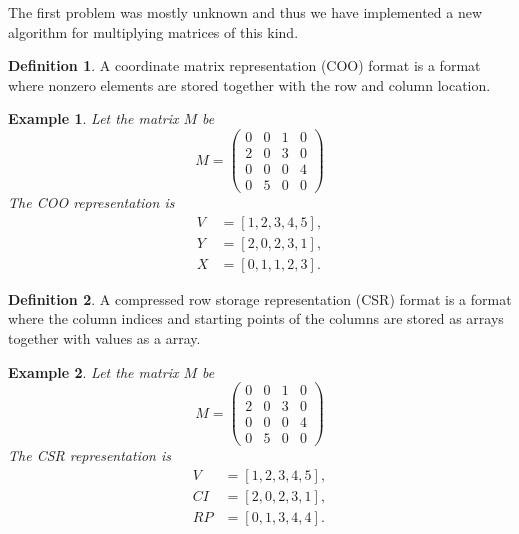 \documentclass[portrait,a0]{sciposter}
\theoremstyle{definition}\newtheorem{definition}{Definition}
\theoremstyle{plain}\newtheorem{example}{Example}
\theoremstyle{plain} \newtheorem{theorem}{Theorem}
\begin{document}
\begin{multicols}{2}
    The first problem was mostly unknown and thus we have implemented a new
    algorithm for multiplying matrices of this kind.

    \begin{definition}
        A coordinate matrix representation (COO) format is a format where nonzero
        elements are stored together with the row and column location.
    \end{definition}

    \begin{example}
        Let the matrix $M$ be
        \[
            M = \left(\begin{matrix}
            0 & 0 & 1 & 0 \\
            2 & 0 & 3 & 0 \\
            0 & 0 & 0 & 4 \\
            0 & 5 & 0 & 0
            \end{matrix}\right)
        \]
        The COO representation is
        \begin{align*}
            V &= [1, 2, 3, 4, 5], \\
            Y & = [2, 0, 2, 3, 1], \\
            X &= [0, 1, 1, 2, 3].
        \end{align*}
    \end{example}

    \begin{definition}
        A compressed row storage representation (CSR) format is a format where
        the column indices and starting points of the columns are stored as
        arrays together with values as a array.

    \end{definition}

    \begin{example}
        Let the matrix $M$ be
        \[
            M = \left(\begin{matrix}
            0 & 0 & 1 & 0 \\
            2 & 0 & 3 & 0 \\
            0 & 0 & 0 & 4 \\
            0 & 5 & 0 & 0
            \end{matrix}\right)
        \]
        The CSR representation is
        \begin{align*}
            V &= [1, 2, 3, 4, 5], \\
            CI &= [2, 0, 2, 3, 1], \\
            RP &= [0, 1, 3, 4, 4]. \\
        \end{align*}
    \end{example}


\end{multicols}
\end{document}
